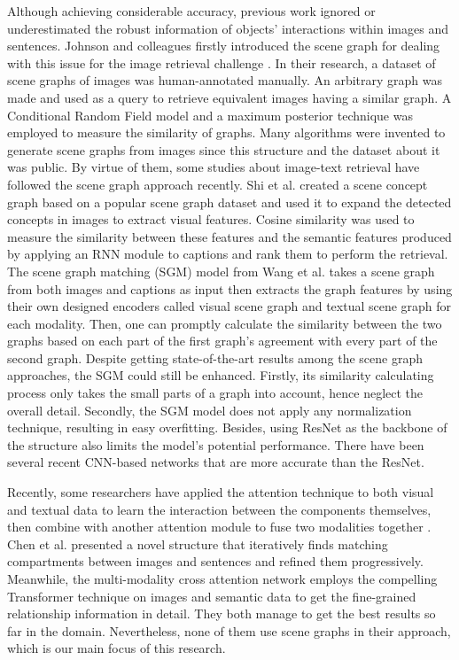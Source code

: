 \documentclass{IOS-Book-Article}
\begin{document}
Although achieving considerable accuracy, previous work ignored or underestimated the robust information of objects' interactions within images and sentences. Johnson and colleagues firstly introduced the scene graph for dealing with this issue for the image retrieval challenge \cite{johnson2015image}. In their research, a dataset of scene graphs of images was human-annotated manually. An arbitrary graph was made and used as a query to retrieve equivalent images having a similar graph. A Conditional Random Field model and a maximum posterior technique was employed to measure the similarity of graphs. Many algorithms were invented to generate scene graphs from images
\cite{yang2018graph,motifnet,tang2019learning,FNet}since this structure and the dataset about it was public. By virtue of them, some studies about image-text retrieval \cite{wang2020cross,shi2019knowledge} have followed the scene graph approach recently. Shi et al. \cite{shi2019knowledge} created a scene concept graph based on a popular scene graph dataset \cite{krishna2017visual} and used it to expand the detected concepts in images to extract visual features. Cosine similarity was used to measure the similarity between these features and the semantic features produced by applying an RNN module to captions and rank them to perform the retrieval. The scene graph matching (SGM) model from Wang et al. \cite{wang2020cross} takes a scene graph from both images and captions as input then extracts the graph features by using their own designed encoders called visual scene graph and textual scene graph for each modality. Then, one can promptly calculate the similarity between the two graphs based on each part of the first graph's agreement with every part of the second graph. Despite getting state-of-the-art results among the scene graph approaches, the SGM could still be enhanced. Firstly, its similarity calculating process only takes the small parts of a graph into account, hence neglect the overall detail. Secondly, the SGM model does not apply any normalization technique, resulting in easy overfitting. Besides, using ResNet \cite{he2016deep} as the backbone of the structure also limits the model's potential performance. There have been several recent CNN-based networks that are more accurate than the ResNet.

Recently, some researchers have applied the attention technique to both visual and textual data to learn the interaction between the components themselves, then combine with another attention module to fuse two modalities together \cite{chen2020imram,wei2020multi}. Chen et al. \cite{chen2020imram} presented a novel structure that iteratively finds matching compartments between images and sentences and refined them progressively. Meanwhile, the multi-modality cross attention network employs the compelling Transformer \cite{vaswani2017attention} technique on images and semantic data to get the fine-grained relationship information in detail. They both manage to get the best results so far in the domain. Nevertheless, none of them use scene graphs in their approach, which is our main focus of this research.
\end{document}

